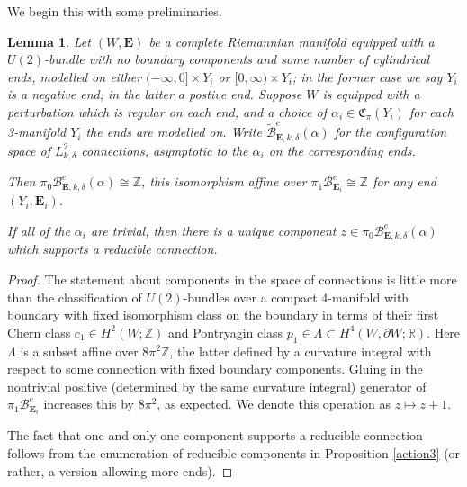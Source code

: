 \documentclass[10pt,a4paper]{amsart}
\newtheorem{lemma}[theorem]{Lemma}
\theoremstyle{definition}
\theoremstyle{remark}
\numberwithin{figure}{qchap}
\begin{document}
We begin this with some preliminaries.

\begin{lemma}Let $(W,\mathbf{E})$ be a complete Riemannian manifold equipped with a $U(2)$-bundle with no boundary components and some number of cylindrical ends, modelled on either $(-\infty, 0] \times Y_i$ or $[0, \infty) \times Y_i$; in the former case we say $Y_i$ is a negative end, in the latter a postive end. Suppose $W$ is equipped with a perturbation which is regular on each end, and a choice of $\alpha_i \in \mathfrak C_\pi(Y_i)$ for each 3-manifold $Y_i$ the ends are modelled on. Write $\widetilde{\mathcal B}^e_{\mathbf{E},k,\delta}(\alpha)$ for the configuration space of $L^2_{k,\delta}$ connections, asymptotic to the $\alpha_i$ on the corresponding ends.

Then $\pi_0 \mathcal B^e_{\mathbf{E},k,\delta}(\alpha) \cong \mathbb Z$, this isomorphism affine over $\pi_1 \mathcal B^e_{\mathbf{E}_i} \cong \mathbb Z$ for any end $(Y_i, \mathbf{E}_i)$.

If all of the $\alpha_i$ are trivial, then there is a unique component $z \in \pi_0 \mathcal B^e_{\mathbf{E},k,\delta}(\alpha)$ which supports a reducible connection.
\end{lemma}

\begin{proof}The statement about components in the space of connections is little more than the classification of $U(2)$-bundles over a compact 4-manifold with boundary with fixed isomorphism class on the boundary in terms of their first Chern class $c_1 \in H^2(W;\mathbb Z)$ and Pontryagin class $p_1 \in \Lambda \subset H^4(W, \partial W; \mathbb R)$. Here $\Lambda$ is a subset affine over $8\pi^2 \mathbb Z$, the latter defined by a curvature integral with respect to some connection with fixed boundary components. Gluing in the nontrivial positive (determined by the same curvature integral) generator of $\pi_1 \mathcal B^e_{\mathbf{E}_i}$ increases this by $8\pi^2$, as expected. We denote this operation as $z \mapsto z+1$.

The fact that one and only one component supports a reducible connection follows from the enumeration of reducible components in Proposition \ref{action3} (or rather, a version allowing more ends).
\end{proof}
\end{document}
